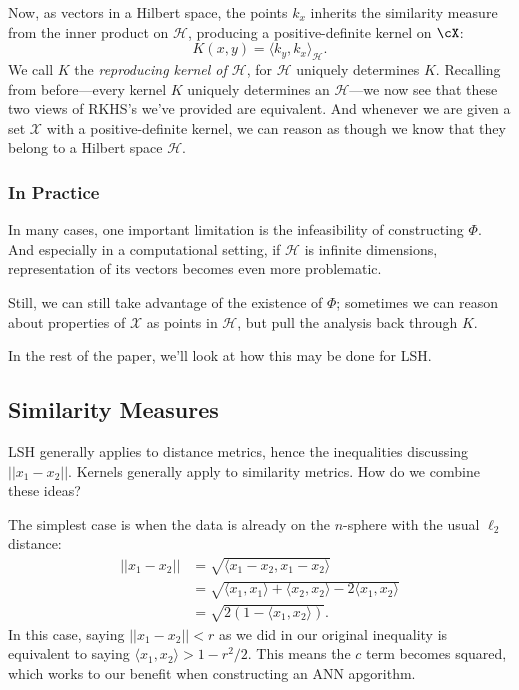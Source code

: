 \documentclass[twoside,11pt]{homework}
\begin{document}
\begin{multicols}{2}
Now, as vectors in a Hilbert space, the points $k_x$ inherits the similarity measure from the inner product on $\mathcal{H}$, producing a positive-definite kernel on $\cX$:
\[K(x,y) = \langle k_y, k_x\rangle_\mathcal{H}.\]
We call $K$ the \emph{reproducing kernel of $\mathcal{H}$}, for $\mathcal{H}$ uniquely determines $K$. Recalling from before---every kernel $K$ uniquely determines an $\mathcal{H}$---we now see that these two views of RKHS's we've provided are equivalent. And whenever we are given a set $\mathcal{X}$ with a positive-definite kernel, we can reason as though we know that they belong to a Hilbert space $\mathcal{H}$.

\subsubsection{In Practice}
In many cases, one important limitation is the infeasibility of constructing $\Phi$. And especially in a computational setting, if $\mathcal{H}$ is infinite dimensions, representation of its vectors becomes even more problematic.

Still, we can still take advantage of the existence of $\Phi$; sometimes we can reason about properties of $\mathcal{X}$ as points in $\mathcal{H}$, but pull the analysis back through $K$.

In the rest of the paper, we'll look at how this may be done for LSH.

\subsection{Similarity Measures}
  
LSH generally applies to distance metrics, hence the inequalities
discussing $||x_1-x_2||$.  Kernels generally apply to similarity
metrics.  How do we combine these ideas?

The simplest case is when the data is already on the $n$-sphere
with the usual $\ell_2$ distance:
\begin{align*}
  ||x_1-x_2|| &=\sqrt{\langle
    x_1-x_2, x_1-x_2 \rangle} \\
  &=\sqrt{\langle x_1,x_1 \rangle+\langle
    x_2,x_2 \rangle - 2 \langle x_1,x_2 \rangle} \\
  &= \sqrt{2(1-\langle
    x_1,x_2 \rangle)}.
\end{align*}
In this case, saying $||x_1-x_2||<r$ as we did
in our original inequality is equivalent to saying $\langle x_1,x_2
\rangle > 1-r^2/2$.  This means the $c$ term becomes squared, which
works to our benefit when constructing an ANN apgorithm.


\end{multicols}
\end{document}
